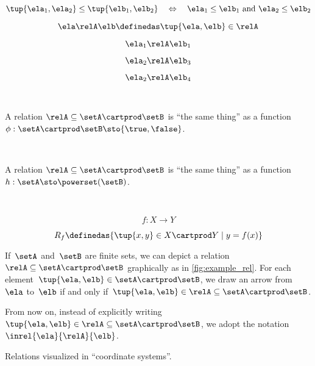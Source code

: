 {\begin{forslides}
        $$ \tup{\ela_1, \ela_2} \leq \tup{\elb_1, \elb_2} \quad \Leftrightarrow \quad \ela_1 \leq \elb_1 \text{ and } \ela_2 \leq \elb_2 \label{eq:slides-14}$$

        \begin{equation}
            \ela \relA \elb \definedas \tup{\ela, \elb} \in \relA  \label{eq:slides-15}
        \end{equation}

        $$ \ela_1 \relA \elb_1 \label{eq:slides-16}$$

        $$ \ela_2 \relA \elb_3 \label{eq:slides-17}$$

        $$ \ela_2 \relA \elb_4 \label{eq:slides-18}$$

        \

        A relation $\relA \subseteq \setA \cartprod \setB$ is ``the same thing'' as a function $\phi : \setA \cartprod \setB \sto \{\true, \false\}$.

        \


        A relation $\relA \subseteq \setA \cartprod \setB$ is ``the same thing'' as a function $h : \setA  \sto \powerset (\setB)$.

        \

        $$
        f : X \to Y
        $$


        $$
        R_f \definedas \{ \tup{x, y} \in X \cartprod Y \mid y = f(x) \}
        $$

    \end{forslides}
}


\begin{marginfigure}
    \centering
    \caption{}
    \label{fig:example_rel}
\end{marginfigure}

If~$\setA$ and~$\setB$ are finite sets, we can depict a relation~$\relA \subseteq \setA \cartprod \setB$ graphically as in \cref{fig:example_rel}.
For each element~$\tup{\ela,\elb} \in \setA \cartprod \setB$, we draw an arrow from~$\ela$ to~$\elb$ if and only if~$\tup{\ela,\elb} \in \relA \subseteq \setA \cartprod \setB$.
\begin{remark}
    From now on, instead of explicitly writing~$\tup{\ela,\elb}\in \relA\subseteq \setA\cartprod \setB$, we adopt the notation~$\inrel{\ela}{\relA}{\elb}$.
\end{remark}


\begin{marginfigure}
    \centering
    \caption{Relations visualized in ``coordinate systems''.}
    \label{fig:example_rel_coord}
\end{marginfigure}

